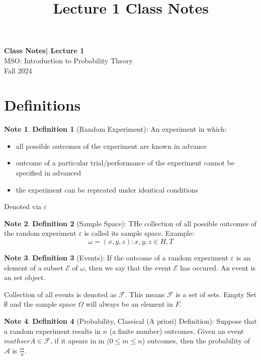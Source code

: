 \documentclass[11pt]{article}
\theoremstyle{definition}
\newtheorem{note}{Note}
\begin{document}
\setcounter{section}{0}
\title{Lecture 1 Class Notes}

\thispagestyle{empty}

\begin{center}
{\LARGE \bf Class Notes| Lecture 1}\\
{\large MSO: Introduction to Probability Theory}\\
Fall 2024
\end{center}


\tableofcontents


\section{Definitions}
\begin{note}
\textbf{Definition 1} (Random Experiment): An experiment in which:
\begin{itemize}
\item all possible outcomes of the experiment are known in advance
\item outcome of a particular trial/performance of the experiment cannot be specified in advanced
\item the experiment can be repreated under identical conditions
\end{itemize}
Denoted via $\varepsilon$
\end{note}

\begin{note}
{\textbf{Definition 2}} (Sample Space): THe collection of all possible outcomes of the random experiment $\varepsilon$ is called its sample space. Example:
$$
\omega = {(x,y,z): x,y,z \in {H, T}}
$$

\end{note}


\begin{note}
{\textbf{Definition 3}} (Events): If the outcome of a random experiment $\varepsilon$ is an element of a subset $\mathscr{E}$ of $\omega$, then we say that the event $\mathscr{E}$ has occured. An event is an set object. 

Collection of all events is denoted as $\mathscr{F}$. This means $\mathscr{F}$ is a set of sets. Empty Set $\emptyset$ and the sample space $\Omega$ will always be an element in $F$.
\end{note}

\begin{note}
{\textbf{Definition 4}} (Probability, Classical (A priori) Definition): Suppose that a random experiment results in $n$ (a finite number) outcomes. Given an event $mathscr{A} \in \mathscr{F}$, if it apears in m ($0 \leq m \leq n$) outcomes, then the probability of $\mathscr{A}$ is $\frac{m}{n}$. \
\end{note}
\end{document}

